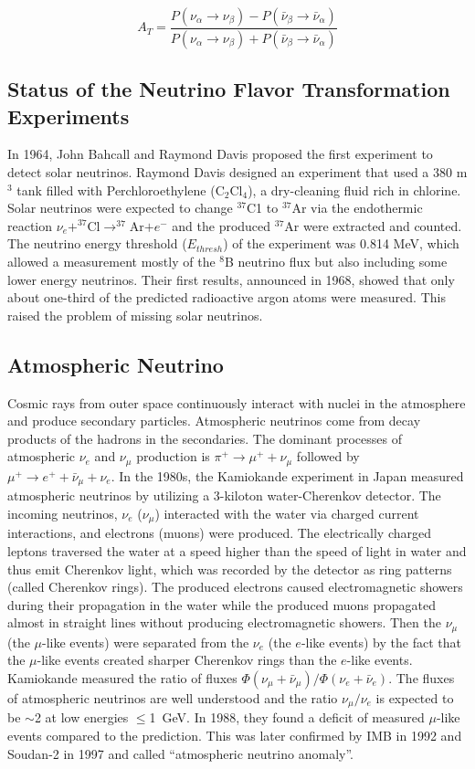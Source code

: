 \[
A_T = \frac{P(\nu_\alpha\to\nu_\beta)-P(\bar{\nu}_\beta\to\bar{\nu}_\alpha)}{P(\nu_\alpha\to\nu_\beta)+P(\bar{\nu}_\beta\to\bar{\nu}_\alpha)}
\]

\subsection{Status of the Neutrino Flavor Transformation Experiments}
In 1964, John Bahcall and Raymond Davis proposed the first experiment to detect solar neutrinos\cite{bahcall1964solar,davis1964solar}. Raymond Davis designed an experiment that used a 380 m$^3$ tank filled with Perchloroethylene (C$_2$Cl$_4$), a dry-cleaning fluid rich in chlorine. Solar neutrinos were expected to change $^{37}$C1 to $^{37}$Ar via the endothermic reaction $\nu_e+^{37}$Cl$\to^{37}$Ar$+e^-$ and the produced $^{37}$Ar were extracted and counted. The neutrino energy threshold ($E_{thresh}$) of the experiment was 0.814 MeV, which allowed a measurement mostly of the $^8$B neutrino flux but also including some lower energy neutrinos\cite{davis1964solar}. Their first results, announced in 1968, showed that only about one-third of the predicted radioactive argon atoms were measured. This raised the problem of missing solar neutrinos.

\subsection{Atmospheric Neutrino}
Cosmic rays from outer space continuously interact with nuclei in the atmosphere and produce secondary particles. Atmospheric neutrinos come from decay products of the hadrons in the secondaries. The dominant processes of atmospheric $\nu_e$ and $\nu_\mu$ production is $\pi^+\to\mu^+ + \nu_\mu$ followed by $\mu^+ \to e^+ + \bar{\nu}_\mu + \nu_e$. In the 1980s, the Kamiokande experiment in Japan measured atmospheric neutrinos by utilizing a 3-kiloton water-Cherenkov detector. The incoming neutrinos, $\nu_e$ ($\nu_\mu$) interacted with the water via charged current interactions, and electrons (muons) were produced. The electrically charged leptons traversed the water at a speed higher than the speed of light in water and thus emit Cherenkov light, which was recorded by the detector as ring patterns (called Cherenkov rings). The produced electrons caused electromagnetic showers during their propagation in the water while the produced muons propagated almost in straight lines without producing electromagnetic showers. Then the $\nu_\mu$ (the $\mu$-like events) were separated from the $\nu_e$ (the $e$-like events) by the fact that the $\mu$-like events created sharper Cherenkov rings than the $e$-like events. Kamiokande measured the ratio of fluxes $\Phi(\nu_\mu+\bar{\nu}_\mu)/\Phi(\nu_e+\bar{\nu}_e)$. The fluxes of atmospheric neutrinos are well understood and the ratio $\nu_\mu/\nu_e$ is expected to be $\sim$2 at low energies $\leq$1~GeV. In 1988, they found a deficit of measured $\mu$-like events compared to the prediction. This was later confirmed by IMB in 1992\cite{becker1992electron} and Soudan-2 in 1997\cite{allison1997measurement} and called ``atmospheric neutrino anomaly''\cite{kajita2012atmospheric}.



